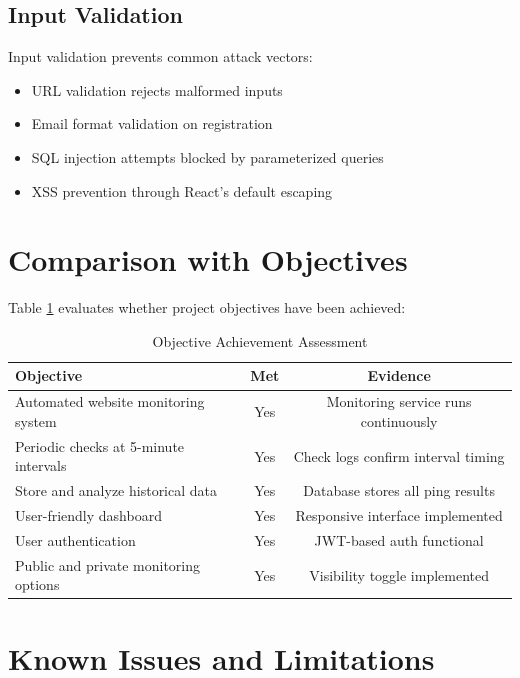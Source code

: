 \subsection{Input Validation}

Input validation prevents common attack vectors:

\begin{itemize}
    \item URL validation rejects malformed inputs
    \item Email format validation on registration
    \item SQL injection attempts blocked by parameterized queries
    \item XSS prevention through React's default escaping
\end{itemize}

\section{Comparison with Objectives}

Table \ref{tab:objectives-met} evaluates whether project objectives have been achieved:

\begin{table}[htbp]
    \centering
    \caption{Objective Achievement Assessment}
    \label{tab:objectives-met}
    \begin{tabular}{p{8cm}cc}
        \toprule
        \textbf{Objective} & \textbf{Met} & \textbf{Evidence} \\
        \midrule
        Automated website monitoring system & Yes & Monitoring service runs continuously \\
        Periodic checks at 5-minute intervals & Yes & Check logs confirm interval timing \\
        Store and analyze historical data & Yes & Database stores all ping results \\
        User-friendly dashboard & Yes & Responsive interface implemented \\
        User authentication & Yes & JWT-based auth functional \\
        Public and private monitoring options & Yes & Visibility toggle implemented \\
        \bottomrule
    \end{tabular}
\end{table}

\section{Known Issues and Limitations}

